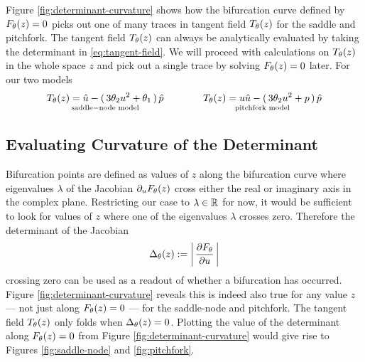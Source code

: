 Figure \ref{fig:determinant-curvature} shows how the bifurcation curve defined by $F_{\theta}(z)=0$ picks out one of many traces in tangent field $T_{\theta}(z)$ for the saddle and pitchfork. The tangent field $T_{\theta}(z)$ can always be analytically evaluated by taking the determinant in \eqref{eq:tangent-field}. We will proceed with calculations on $T_{\theta}(z)$ in the whole space $z$ and pick out a single trace by solving $F_{\theta}(z)=0$ later. For our two models
\begin{align}
    \underset{\mathrm{saddle-node\,\,model}}{
    T_{\theta}(z)=\hat{u}-(\,3\theta_2 u^2+\theta_1\,)\,\hat{p}}
    \qquad\qquad
    \underset{\mathrm{pitchfork\,\,model}}{
    T_{\theta}(z)=u\hat{u}-(\,3\theta_2 u^2+p\,)\,\hat{p}}
    \label{eq:tangent-field-examples}
\end{align}

\subsection{Evaluating Curvature of the Determinant}
Bifurcation points are defined as values of $z$ along the bifurcation curve where eigenvalues $\lambda$ of the Jacobian $\partial_u F_{\theta}(z)$ cross either the real or imaginary axis in the complex plane. Restricting our case to $\lambda\in\mathbb{R}$ for now, it would be sufficient to look for values of $z$ where one of the eigenvalues $\lambda$ crosses zero. Therefore the determinant of the Jacobian
\begin{align}
    \Delta_{\theta}(z) := \left|\,\frac{\partial F_{\theta}}{\partial u}\,\right|
\end{align}
crossing zero can be used as a readout of whether a bifurcation has occurred. Figure \ref{fig:determinant-curvature} reveals this is indeed also true for any value $z$ --- not just along $F_{\theta}(z)=0$ --- for the saddle-node and pitchfork. The tangent field $T_{\theta}(z)$ only folds when $\Delta_{\theta}(z)=0$. Plotting the value of the determinant along $F_{\theta}(z)=0$ from Figure \ref{fig:determinant-curvature} would give rise to Figures \ref{fig:saddle-node} and \ref{fig:pitchfork}.


